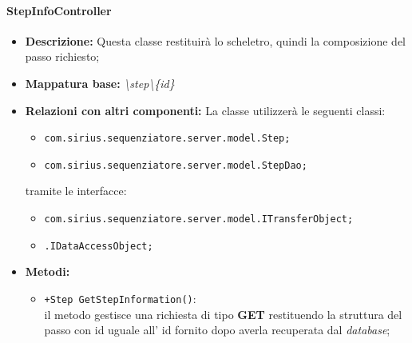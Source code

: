 \paragraph{StepInfoController}%
\begin{itemize}
	\item \textbf{Descrizione: }Questa classe restituirà lo scheletro, quindi la composizione del passo richiesto;
	\item \textbf{Mappatura base: }\textit{\textbackslash step\textbackslash \{id\}}
	\item \textbf{Relazioni con altri componenti: }
	La classe utilizzerà le seguenti classi:
	\begin{itemize}
		\item \texttt{com.sirius.sequenziatore.server.model.Step;}
		\item \texttt{com.sirius.sequenziatore.server.model.StepDao;}
	\end{itemize}
	tramite le interfacce:
	\begin{itemize}
		\item \texttt{com.sirius.sequenziatore.server.model.ITransferObject;}
		\item \texttt{\sModel .IDataAccessObject;}
	\end{itemize}
	\item \textbf{Metodi: }\begin{itemize}
					\item \texttt{+Step GetStepInformation()}:\\
					 il metodo gestisce una richiesta di tipo \textbf{GET} restituendo la struttura del passo con id uguale all' id fornito dopo averla recuperata dal \textit{database};
				\end{itemize}
\end{itemize}
